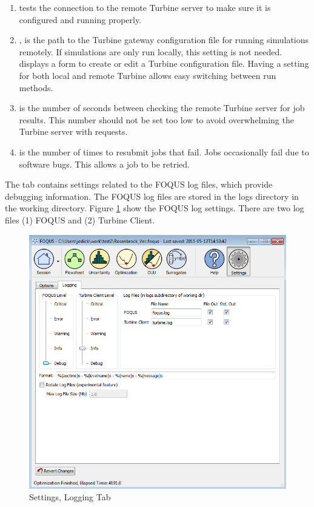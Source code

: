 \begin{enumerate}
	\item {} tests the connection to the remote Turbine server to make sure it is configured and running properly.

	\item {}, is the path to the Turbine gateway configuration file for running simulations remotely. If simulations are only run locally, this setting is not needed.  displays a form to create or edit a Turbine configuration file. Having a setting for both local and remote Turbine allows easy switching between run methods.
	
	\item {} is the number of seconds between checking the remote Turbine server for job results. This number should not be set too low to avoid overwhelming the Turbine server with requests.
	
	\item {} is the number of times to resubmit jobs that fail. Jobs occasionally fail due to software bugs. This allows a job to be retried.

\end{enumerate}

The  tab contains settings related to the FOQUS log files, which provide debugging information. The FOQUS log files are stored in the logs directory in the working directory. Figure \ref{fig.settings.logging} show the FOQUS log settings. There are two log files (1) FOQUS and (2) Turbine Client.

\begin{figure}[H]
	\begin{center}
		\includegraphics[scale=0.55]{Chapt_flowsheet/figs/settings_logging}
		\caption{Settings, Logging Tab}
		\label{fig.settings.logging}
	\end{center}
\end{figure}

